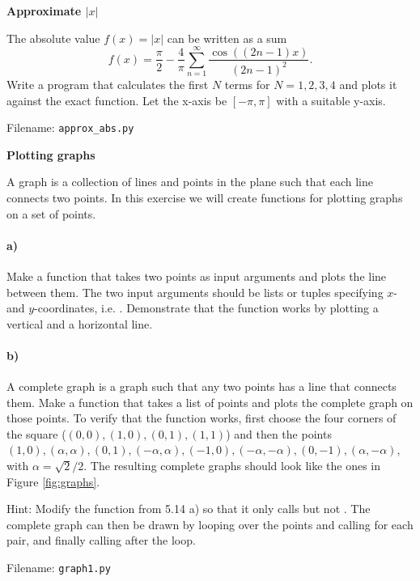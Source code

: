 \begin{Problem}{\textbf{Approximate $|x|$}}

\noindent The absolute value $f(x)=|x|$ can be written as a sum
\begin{equation*}
	f(x)=\frac{\pi}{2}-\frac{4}{\pi} \sum_{n=1}^\infty \frac{\cos((2n-1)x)}{(2n-1)^2}.
\end{equation*}
Write a program that calculates the first $N$ terms for $N=1,2,3,4$ and plots it against
the exact function. Let the x-axis be $[-\pi,\pi]$ with a suitable y-axis.

Filename: \texttt{approx\_abs.py}
\end{Problem}

\begin{Problem}{\textbf{Plotting graphs}}

\noindent A graph is a collection of lines and points in the plane 
such that each line connects two points. In this exercise we will create functions for
plotting graphs on a set of points. 

\paragraph{a)}
Make a function  that takes two points as input arguments
and plots the line between them. The two input arguments should be lists or tuples specifying
$x$- and $y$-coordinates, i.e. . Demonstrate that the function works by plotting a vertical and a horizontal line. 

\paragraph{b)}
A complete graph is a graph such that any two points has a line that connects them. Make a function that takes a list of points and plots the complete graph on those points. To verify that the
function works, first choose the four corners of the square ($(0,0),(1,0),(0,1),(1,1)$) 
and then the points $(1,0), (\alpha,\alpha), (0,1), (-\alpha,\alpha),
(-1,0), (-\alpha,-\alpha),(0,-1), (\alpha,-\alpha)$, with $\alpha=\sqrt{2}/2$. The resulting 
complete graphs should look like the ones in Figure \ref{fig:graphs}.

Hint: Modify the  function from 5.14 a) so that it only calls 
 but not . The complete graph can then be drawn by 
looping over the points and calling  for each pair, and finally calling
 after the loop.

Filename: \texttt{graph1.py}
\end{Problem}

